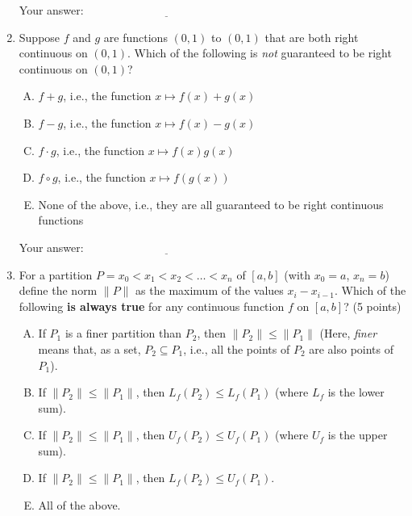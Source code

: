 \documentclass[10pt]{amsart}
\begin{document}
\begin{enumerate}
  \vspace{0.1in}
  Your answer: $\underline{\qquad\qquad\qquad\qquad\qquad\qquad\qquad}$
  \vspace{0.6in}

\item Suppose $f$ and $g$ are functions $(0,1)$ to $(0,1)$ that are
  both right continuous on $(0,1)$. Which of the following is {\em not}
  guaranteed to be right continuous on $(0,1)$?

  \begin{enumerate}[(A)]
  \item $f + g$, i.e., the function $x \mapsto f(x) + g(x)$
  \item $f - g$, i.e., the function $x \mapsto f(x) - g(x)$
  \item $f \cdot g$, i.e., the function $x \mapsto f(x)g(x)$
  \item $f \circ g$, i.e., the function $x \mapsto f(g(x))$
  \item None of the above, i.e., they are all guaranteed to be right
    continuous functions
  \end{enumerate}

  \vspace{0.1in}
  Your answer: $\underline{\qquad\qquad\qquad\qquad\qquad\qquad\qquad}$
  \vspace{0.6in}

\item For a partition $P = x_0 < x_1 < x_2 < \dots < x_n$ of $[a,b]$
  (with $x_0 = a$, $x_n = b$) define the norm $\| P \|$ as the maximum
  of the values $x_i - x_{i-1}$. Which of the following {\bf is always
  true} for any continuous function $f$ on $[a,b]$? (5 points)

  \begin{enumerate}[(A)]
  \item If $P_1$ is a finer partition than $P_2$, then $\| P_2 \| \le
    \| P_1 \|$ (Here, {\em finer} means that, as a set, $P_2 \subseteq
    P_1$, i.e., all the points of $P_2$ are also points of $P_1$).
  \item If $\| P_2 \| \le \| P_1 \|$, then $L_f(P_2) \le L_f(P_1)$
    (where $L_f$ is the lower sum).
  \item If $\| P_2 \| \le \| P_1 \|$, then $U_f(P_2) \le U_f(P_1)$
    (where $U_f$ is the upper sum).
  \item If $\| P_2 \| \le \| P_1 \|$, then $L_f(P_2) \le U_f(P_1)$.
  \item All of the above.
  \end{enumerate}


\end{enumerate}
\end{document}
